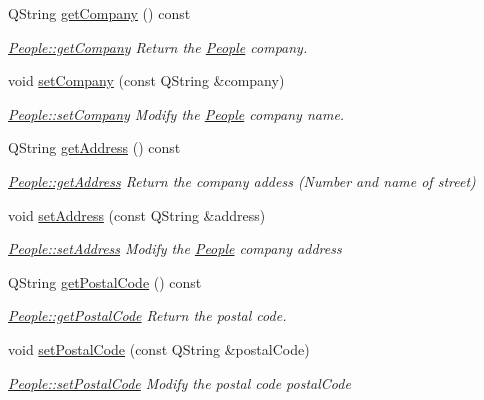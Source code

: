 \begin{DoxyCompactItemize}
Q\+String \hyperlink{classModels_1_1People_af4d0cf50ce941c262717b6f10b9d4b89}{get\+Company} () const 
\begin{DoxyCompactList}\small\item\em \hyperlink{classModels_1_1People_af4d0cf50ce941c262717b6f10b9d4b89}{People\+::get\+Company} Return the \hyperlink{classModels_1_1People}{People} company. \end{DoxyCompactList}\item 
void \hyperlink{classModels_1_1People_aded3f48b5afb01c78379c9a63c35d5c3}{set\+Company} (const Q\+String \&company)
\begin{DoxyCompactList}\small\item\em \hyperlink{classModels_1_1People_aded3f48b5afb01c78379c9a63c35d5c3}{People\+::set\+Company} Modify the \hyperlink{classModels_1_1People}{People} {\itshape company} name. \end{DoxyCompactList}\item 
Q\+String \hyperlink{classModels_1_1People_a4d327556f59357912c54c14cf940151d}{get\+Address} () const 
\begin{DoxyCompactList}\small\item\em \hyperlink{classModels_1_1People_a4d327556f59357912c54c14cf940151d}{People\+::get\+Address} Return the company addess (Number and name of street) \end{DoxyCompactList}\item 
void \hyperlink{classModels_1_1People_ab4e49bbc2de9ed31276e50e768c9bdee}{set\+Address} (const Q\+String \&address)
\begin{DoxyCompactList}\small\item\em \hyperlink{classModels_1_1People_ab4e49bbc2de9ed31276e50e768c9bdee}{People\+::set\+Address} Modify the \hyperlink{classModels_1_1People}{People} company {\itshape address} \end{DoxyCompactList}\item 
Q\+String \hyperlink{classModels_1_1People_a30999a844f67ddef254e2c2343df8946}{get\+Postal\+Code} () const 
\begin{DoxyCompactList}\small\item\em \hyperlink{classModels_1_1People_a30999a844f67ddef254e2c2343df8946}{People\+::get\+Postal\+Code} Return the postal code. \end{DoxyCompactList}\item 
void \hyperlink{classModels_1_1People_a89ea420d87ce7e32e8fc1b7a83616eaf}{set\+Postal\+Code} (const Q\+String \&postal\+Code)
\begin{DoxyCompactList}\small\item\em \hyperlink{classModels_1_1People_a89ea420d87ce7e32e8fc1b7a83616eaf}{People\+::set\+Postal\+Code} Modify the postal code {\itshape postal\+Code} \end{DoxyCompactList}\item 

\end{DoxyCompactItemize}
